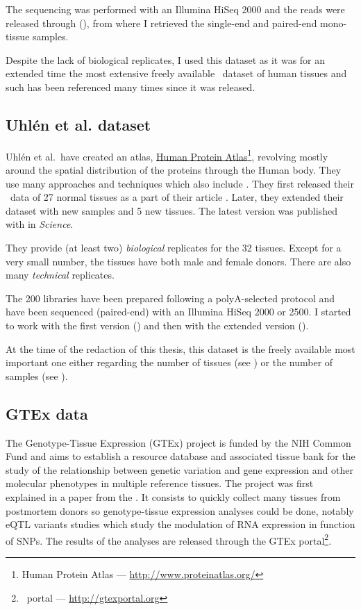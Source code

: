 The sequencing was performed with an Illumina HiSeq 2000 and the reads were
released through  (), from where I
retrieved the single-end and paired-end mono-tissue samples.

Despite the lack of biological replicates, I used this dataset as it was for an
extended time the most extensive freely available \Rnaseq\ dataset of human
tissues and such has been referenced many times since it was released.

\subsection{Uhlén et al. dataset}

Uhlén et al.\ have created an atlas,
\href{http://www.proteinatlas.org/}{Human Protein Atlas}\footnote{%
Human Protein Atlas ---
\href{http://www.proteinatlas.org/}{http://www.proteinatlas.org/}},
revolving mostly around the spatial
distribution of the proteins through the Human body. They use many approaches
and techniques which also include \Rnaseq. They first released their \Rnaseq\
data of 27 normal tissues as a part of their article 
\citep{Uhlen2014}. Later, they extended their dataset with new samples and 5 new
tissues. The latest version was published with \paper{\citetitle{Uhlen2015}}
\citep{Uhlen2015} in \textit{Science}.

They provide (at least two) \emph{biological} replicates for the 32 tissues.
Except for a very small number, the tissues have both male and female donors.
There are also many \emph{technical} replicates.

The 200 libraries have been prepared following a polyA-selected protocol and
have been sequenced (paired-end) with an Illumina HiSeq 2000 or 2500. I started
to work with the first version (\ArrayExpress{E-MTAB-1733}) and then
with the extended version (\ArrayExpress{E-MTAB-2836}).

At the time of the redaction of this thesis, this dataset is the freely available
most important one either regarding the number of tissues
(see ) or the number of samples (see ).


\subsection{GTEx data}

The Genotype-Tissue Expression (\gls{GTEx}) project is funded by the \gls{NIH}
Common Fund and aims to establish a resource database and associated tissue bank
for the study of the relationship between genetic variation and gene expression
and other molecular phenotypes in multiple reference tissues. The project was first
explained in a paper from the \cite{GTEx2013}. It consists to quickly collect
many tissues from postmortem donors so genotype-tissue expression analyses could
be done, notably \gls{eQTL} variants studies which study the modulation
of \gls{RNA} expression in function of \glspl{SNP}. The results of the
analyses are released through the GTEx portal\footnote{\Gtex\ portal --- %
\href{http://gtexportal.org}{http://gtexportal.org}}.

